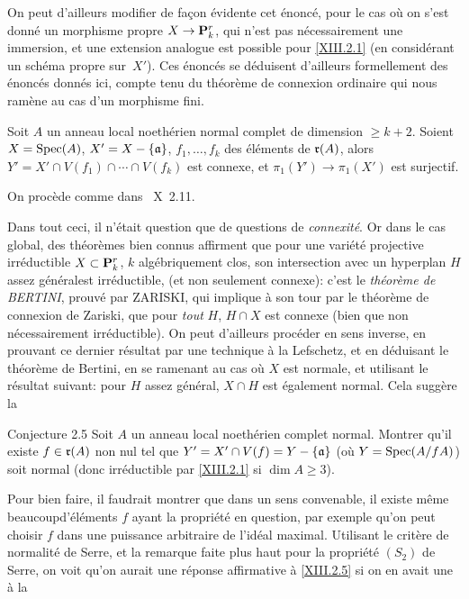 On peut d'ailleurs modifier de fa\c con
\'evidente cet \'enonc\'e, pour le cas o\`u on s'est donn\'e un morphisme
propre $X \to \PP^r_k$, qui n'est pas n\'ecessairement une
immersion, et une extension analogue est possible pour
\ref{XIII.2.1} (en consid\'erant un sch\'ema propre sur~$X'$). Ces
\'enonc\'es se d\'eduisent d'ailleurs formellement des \'enonc\'es donn\'es
ici, compte tenu du th\'eor\`eme de connexion ordinaire qui nous
ram\`ene au cas d'un morphisme fini.

\begin{corollaire} \label{XIII.2.4}
Soit $A$ un anneau local noeth\'erien normal complet de dimension $\ge k+2$. Soient $X=\operatorname{Spec} (A)$, $X'=X-\{ \mathfrak{a}\}$, $f_1, \dotsc, f_k$ des \'el\'ements de $\mathfrak{r}(A)$, alors $Y'=X'\cap V(f_1) \cap \dotsb \cap V(f_k)$ est connexe, et $\pi_1(Y')\to \pi_1(X')$ est surjectif.
\end{corollaire}

On proc\`ede comme dans ~X~2.11.

Dans tout ceci, il n'\'etait question que de questions de \emph{connexité}. Or dans le cas global, des th\'eor\`emes bien connus affirment que pour une vari\'et\'e projective irr\'eductible $X\subset {\mathbf P}^r_k$, $k$ alg\'ebriquement clos, son intersection avec un hyperplan $H$ assez \og g\'en\'eral\fg est irr\'eductible, (et non seulement connexe): c'est le \emph{théorème de BERTINI}, prouv\'e par ZARISKI, qui implique \`a son tour par le th\'eor\`eme de connexion de Zariski, que pour \emph{tout} $H$, $H\cap X$ est connexe (bien que non n\'ecessairement irr\'eductible). On peut d'ailleurs proc\'eder en sens inverse, en prouvant ce dernier r\'esultat par une technique \`a la Lefschetz, et en d\'eduisant le th\'eor\`eme de Bertini, en se ramenant au cas o\`u $X$ est normale, et utilisant le r\'esultat suivant: pour $H$ \og assez g\'en\'eral\fg, $X\cap H$ est \'egalement normal. Cela sugg\`ere la

\label{XIII.2.5}
\begin{enonce*}{Conjecture 2.5\ndemark}
Soit $A$ un anneau local noeth\'erien complet normal. Montrer qu'il existe $f\in\mathfrak{r}(A)$ non nul tel que $Y'=X'\cap V(f)=Y-\{ \mathfrak{a}\}$ (o\`u $Y=\operatorname{Spec} (A/fA)$) soit normal (donc irr\'eductible par \ref{XIII.2.1} si $\dim A\ge 3$).
\end{enonce*}

Pour bien faire, il faudrait montrer que dans un sens convenable, il existe m\^eme \og beaucoup\fg d'\'el\'ements $f$ ayant la propri\'et\'e en question, par exemple qu'on peut choisir $f$ dans une puissance arbitraire de l'id\'eal maximal. Utilisant le crit\`ere de normalit\'e de Serre, et la remarque faite plus haut pour la propri\'et\'e $(S_2)$ de Serre, on voit qu'on aurait une r\'eponse affirmative \`a \ref{XIII.2.5} si on en avait une \`a la

